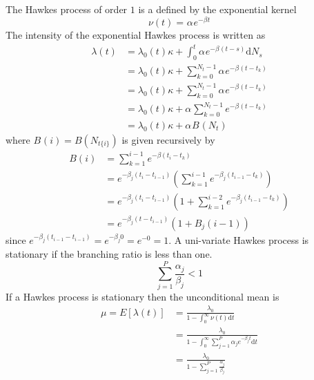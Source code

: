 \documentclass{amsart}
\newcommand{\mathd}{\mathrm{d}}
\begin{document}
The Hawkes process of order $1$ is a defined by the exponential kernel
\begin{equation}
  \nu ( t) =^{} \alpha_{} e^{- \beta_{} t} \label{exp}
\end{equation}
The intensity of the exponential Hawkes process is written as
\begin{equation}
  \begin{array}{ll}
    \lambda ( t) & = \lambda_0 ( t) \kappa + \int_0^t \alpha_{} e^{- \beta_{}
    ( t - s)} \mathd N_s\\
    & = \lambda_0 ( t) \kappa + \sum_{k = 0}^{N_t - 1} \alpha_{} e^{-
    \beta_{} ( t - t_k)}\\
    & = \lambda_0 ( t) \kappa + \sum_{k = 0}^{N_t - 1} \alpha_{} e^{-
    \beta_{} ( t - t_k)}\\
    & = \lambda_0 ( t) \kappa + \alpha_{} \sum_{k = 0}^{N_t - 1} e^{-
    \beta_{} ( t - t_k)}\\
    & = \lambda_0 ( t) \kappa + \alpha_{} B_{} ( N_t)
  \end{array}
\end{equation}
where $B_{} ( i) = B ( N_{t \{ i \}})$ is given recursively by
\begin{equation}
  \begin{array}{ll}
    B ( i) & = \sum_{k = 1}^{i - 1} e^{- \beta ( t_i - t_k)}\\
    & = e^{- \beta_j ( t_i - t_{i - 1})}_{} \left( \sum_{k = 1}^{i - 1} e^{-
    \beta_j ( t_{i - 1} - t_k)} \right)\\
    & = e^{- \beta_j ( t_i - t_{i - 1})}_{}  \left( 1 + \sum_{k = 1}^{i - 2}
    e^{- \beta_j ( t_{i - 1} - t_k)} \right)\\
    & = e^{- \beta_j ( t - t_{i - 1})} ( 1 + B_j ( i - 1))
  \end{array} \label{Bj}
\end{equation}
since $e^{- \beta_j ( t_{i - 1} - t_{i - 1})} = e^{- \beta_j 0} = e^{- 0} =
1$. A uni-variate Hawkes process is stationary if the branching ratio is less
than one.
\begin{equation}
  \sum_{j = 1}^P \frac{\alpha_j}{\beta_j} < 1 \label{hs}
\end{equation}
If a Hawkes process is stationary then the unconditional mean is
\begin{equation}
  \begin{array}{ll}
    \mu = E [ \lambda ( t)] & = \frac{\lambda_0}{1 - \int_0^{\infty} \nu ( t)
    \mathd t}\\
    & = \frac{\lambda_0}{1 - \int_0^{\infty} \sum_{j = 1}^P \alpha_j e^{-
    \beta_j t} \mathd t}\\
    & = \frac{\lambda_0}{1 - \sum_{j = 1}^P \frac{\alpha_j}{\beta_j}}
  \end{array} \label{hm}
\end{equation}
\end{document}
